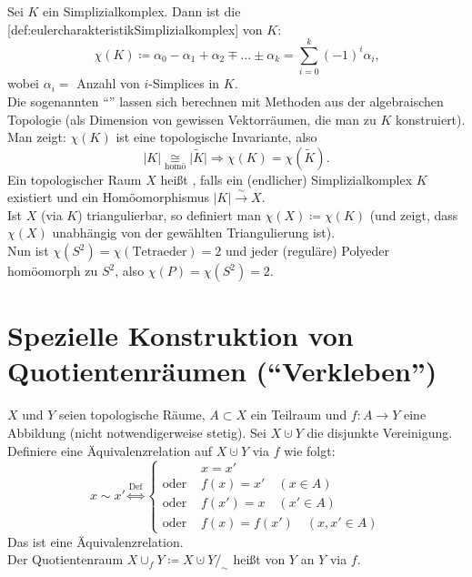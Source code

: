 \begin{definition}
  Sei \( K \) ein Simplizialkomplex. Dann ist die [def:eulercharakteristikSimplizialkomplex] von \( K \):
  \begin{equation*}
    \chi(K) \coloneqq \alpha_0-\alpha_1+\alpha_2 \mp \dots \pm \alpha_k = \sum_{i = 0}^k {(-1)}^i\alpha_i\text{,}
  \end{equation*}
  wobei \( \alpha_i = \) Anzahl von \( i \)-Simplices in \( K \). \\
  Die sogenannten ``''\label{def:bettiZahlen} lassen sich berechnen mit Methoden aus der algebraischen Topologie (als Dimension von gewissen Vektorräumen, die man zu \( K \) konstruiert). \\
  Man zeigt: \( \chi(K) \) ist eine topologische Invariante, also 
  \begin{equation*}
    \vert K \vert \underset{\text{homö}}{\cong} \vert \widetilde{K} \vert \Rightarrow \chi(K) = \chi(\widetilde{K})\text{.}
  \end{equation*}
  Ein topologischer Raum \( X \) heißt \label{def:triangulierbar}, falls ein (endlicher) Simplizialkomplex \( K \) existiert und ein Homöomorphismus \( \vert K \vert \overset{\sim}{\to} X \). \\
  Ist \( X \) (via \( K \)) triangulierbar, so definiert man \( \chi(X) \coloneqq \chi(K) \) (und zeigt, dass \( \chi(X) \) unabhängig von der gewählten Triangulierung ist). \\
  Nun ist \( \chi(S^2) = \chi(\text{Tetraeder}) = 2 \) und jeder (reguläre) Polyeder homöomorph zu \( S^2 \), also \( \chi(P) = \chi(S^2) = 2 \).
\end{definition}

\section{Spezielle Konstruktion von Quotientenräumen (``Verkleben'')}

\begin{definition}[Verklebung]
  \( X \) und \( Y \) seien topologische Räume, \( A \subset X \) ein Teilraum und \( f: A \to Y \) eine Abbildung (nicht notwendigerweise stetig). Sei \( X \cupdot Y \) die disjunkte Vereinigung. Definiere eine Äquivalenzrelation auf \( X \cupdot Y \) via \( f \) wie folgt:
  \begin{equation*}
    x \sim x' \overset{\text{Def}}{\Leftrightarrow} \begin{cases}
      &x = x' \\
      \text{oder } &f(x) = x' \quad (x \in A) \\
      \text{oder } &f(x') = x \quad (x' \in A) \\
      \text{oder } &f(x) = f(x') \quad (x, x' \in A)
    \end{cases}
  \end{equation*}
  Das ist eine Äquivalenzrelation. \\
  Der Quotientenraum \( X \cup_f Y \coloneqq X \cupdot Y /_\sim \) heißt \label{def:verklebung} von \( Y \) an \( Y \) via \( f \).
\end{definition}

